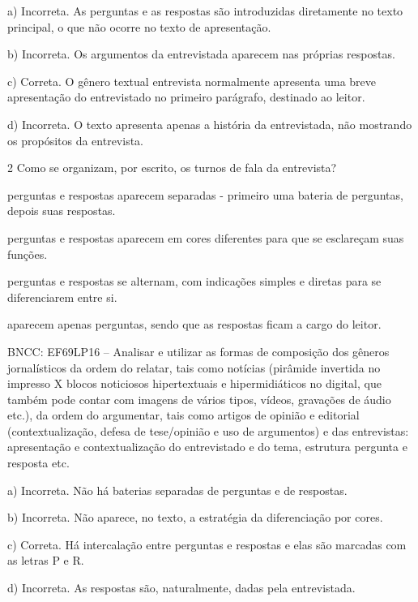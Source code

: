 \begin{escolha}
\begin{escolha}
\begin{escolha}
\begin{escolha}
\begin{escolha}
a) Incorreta. As perguntas e as respostas são introduzidas diretamente
no texto principal, o que não ocorre no texto de apresentação.

b) Incorreta. Os argumentos da entrevistada aparecem nas próprias
respostas.

c) Correta. O gênero textual entrevista normalmente apresenta uma breve
apresentação do entrevistado no primeiro parágrafo, destinado ao leitor.

d) Incorreta. O texto apresenta apenas a história da entrevistada, não
mostrando os propósitos da entrevista.

\num{2} Como se organizam, por escrito, os turnos de fala da entrevista?

\begin{escolha}
\item perguntas e respostas aparecem separadas - primeiro uma bateria de
perguntas, depois suas respostas.

\item perguntas e respostas aparecem em cores diferentes para que se
esclareçam suas funções.

\item perguntas e respostas se alternam, com indicações simples e diretas
para se diferenciarem entre si.

\item aparecem apenas perguntas, sendo que as respostas ficam a cargo do
leitor.
\end{escolha}

BNCC: EF69LP16 -- Analisar e utilizar as formas de composição dos
gêneros jornalísticos da ordem do relatar, tais como notícias (pirâmide
invertida no impresso X blocos noticiosos hipertextuais e
hipermidiáticos no digital, que também pode contar com imagens de vários
tipos, vídeos, gravações de áudio etc.), da ordem do argumentar, tais
como artigos de opinião e editorial (contextualização, defesa de
tese/opinião e uso de argumentos) e das entrevistas: apresentação e
contextualização do entrevistado e do tema, estrutura pergunta e
resposta etc.

a) Incorreta. Não há baterias separadas de perguntas e de respostas.

b) Incorreta. Não aparece, no texto, a estratégia da diferenciação por
cores.

c) Correta. Há intercalação entre perguntas e respostas e elas são
marcadas com as letras P e R.

d) Incorreta. As respostas são, naturalmente, dadas pela entrevistada.


\end{escolha}
\end{escolha}
\end{escolha}
\end{escolha}
\end{escolha}
